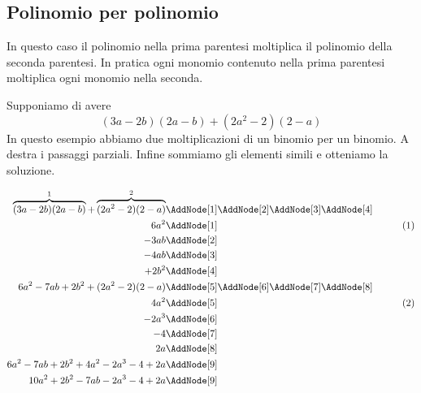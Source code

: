 \subsection{Polinomio per polinomio}
In questo caso il polinomio nella prima parentesi moltiplica il polinomio della seconda parentesi. In pratica ogni monomio contenuto nella prima parentesi moltiplica ogni monomio nella seconda.
\begin{center}

\end{center}
\begin{esempio}
Supponiamo di avere \[(3a-2b)(2a-b)+(2a^2-2)(2-a)\]
 In questo esempio abbiamo due moltiplicazioni di un binomio per un binomio. A destra i passaggi parziali. Infine sommiamo  gli elementi simili e otteniamo la soluzione.
 \begin{NodesList}
 	\begin{align*}
 		\overbrace{(3a-2b)(2a-b)}^{1}+\overbrace{(2a^2-2)(2-a)}^{2}&\nonumber\AddNode[1]\AddNode[2]\AddNode[3]\AddNode[4]\\
 		6a^2&\AddNode[1]&\tag{1}\\ 
 		-3ab&\AddNode[2]&\\
 		-4ab&\AddNode[3]&\\    
 		+2b^2&\AddNode[4]&\\
 		6a^2-7ab+2b^2+(2a^2-2)(2-a)&\nonumber\AddNode[5]\AddNode[6]\AddNode[7]\AddNode[8]\\
 		4a^2&\AddNode[5]&\tag{2}\\
 		-2a^3&\AddNode[6]&\\
 		-4 &\AddNode[7]&\\   
 		2a&\AddNode[8]&\\   
 		6a^2-7ab+2b^2+4a^2-2a^3-4+2a&\nonumber\AddNode[9]\\
 		10a^2+2b^2-7ab-2a^3-4+2a&\nonumber\AddNode[9]
 	\end{align*}
 \end{NodesList}
\end{esempio}
